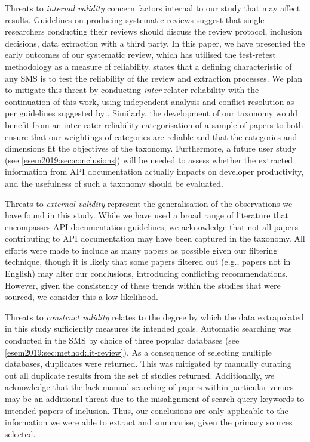 Threats to \textit{internal validity} concern factors internal to our study that may affect results. Guidelines on producing systematic reviews \citep{Kitchenham:2007dd} suggest that single researchers conducting their reviews should discuss the review protocol, inclusion decisions, data extraction with a third party. In this paper, we have presented the early outcomes of our systematic review, which has utilised the test-retest methodology as a measure of reliability. \citet{5416726} states that a defining characteristic of any SMS is to test the reliability of the review and extraction processes. We plan to mitigate this threat by conducting \textit{inter}-relater reliability with the continuation of this work, using independent analysis and conflict resolution as per guidelines suggested by \citet{Garousi:2017:EGE:3084226.3084238}. Similarly, the development of our taxonomy would benefit from an inter-rater reliability categorisation of a sample of papers to both ensure that our weightings of categories are reliable and that the categories and dimensions fit the objectives of the taxonomy. Furthermore, a future user study (see \cref{esem2019:sec:conclusions}) will be needed to assess whether the extracted information from API documentation actually impacts on developer productivity, and the usefulness of such a taxonomy should be evaluated.


Threats to \textit{external validity} represent the generalisation of the observations we have found in this study. While we have used a broad range of literature that encompasses API documentation guidelines, we acknowledge that not all papers contributing to API documentation may have been captured in the taxonomy. All efforts were made to include as many papers as possible given our filtering technique, though it is likely that some papers filtered out (e.g., papers not in English) may alter our conclusions, introducing conflicting recommendations. However, given the consistency of these trends within the studies that were sourced, we consider this a low likelihood.

Threats to \textit{construct validity} relates to the degree by which the data extrapolated in this study sufficiently measures its intended goals. Automatic searching was conducted in the SMS by choice of three popular databases (see \cref{esem2019:sec:method:lit-review}). As a consequence of selecting multiple databases, duplicates were returned. This was mitigated by manually curating out all duplicate results from the set of studies returned. Additionally, we acknowledge that the lack manual searching of papers within particular venues may be an additional threat due to the misalignment of search query keywords to intended papers of inclusion. Thus, our conclusions are only applicable to the information we were able to extract and summarise, given the primary sources selected.

